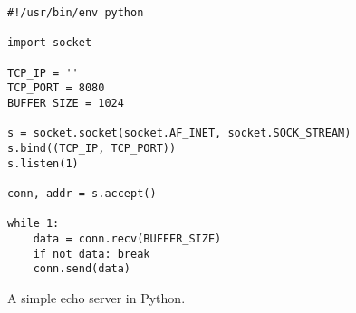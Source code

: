 \begin{columns}
    \column{\textwidth}
\begin{listing}[htpb]
    \begin{verbatim}
#!/usr/bin/env python

import socket

TCP_IP = ''
TCP_PORT = 8080
BUFFER_SIZE = 1024

s = socket.socket(socket.AF_INET, socket.SOCK_STREAM)
s.bind((TCP_IP, TCP_PORT))
s.listen(1)

conn, addr = s.accept()

while 1:
    data = conn.recv(BUFFER_SIZE)
    if not data: break
    conn.send(data)
    \end{verbatim}
    \caption{A simple echo server in Python.}
    \label{fig:server-test-code}
\end{listing}
\end{columns}
